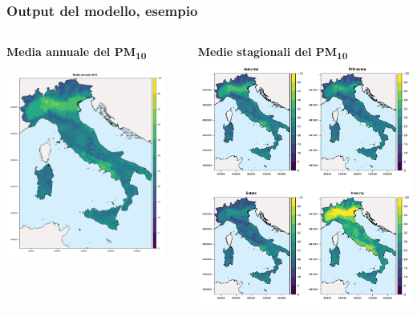 \documentclass{beamer}
\begin{document}
\begin{frame}
\end{frame}


\begin{frame}
\frametitle{Output del modello, esempio}
\begin{columns}
\begin{column}{0.5\textwidth}
\centerline{\textbf{Media annuale del PM\textsubscript{10}}}
\includegraphics[width=0.9\textwidth]{mappAnnuale_fixedRange.png}
\end{column}
\begin{column}{0.5\textwidth}
\textbf{Medie stagionali del PM\textsubscript{10}}
\includegraphics[height=0.9\textwidth]{mappe_stagionali_fixed_range.png}
\end{column}
\end{columns}
\end{frame}
\end{document}
